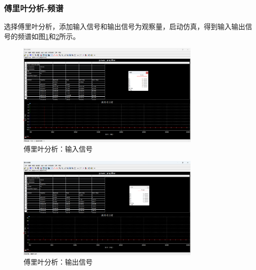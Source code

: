 \documentclass[UTF8]{ctexart}
\begin{document}
\subsubsection{傅里叶分析-频谱}
选择傅里叶分析，添加输入信号和输出信号为观察量，启动仿真，得到输入输出信号的频谱如图\ref{img:5}和\ref{img:6}所示。
\begin{figure}[htbp]
    \centering
    \includegraphics[width=0.8\textwidth]{5.png}
    \caption{傅里叶分析：输入信号}
    \label{img:5}
\end{figure}
\begin{figure}[htbp]
    \centering
    \includegraphics[width=0.8\textwidth]{6}
    \caption{傅里叶分析：输出信号}
    \label{img:6}
\end{figure}
\end{document}
